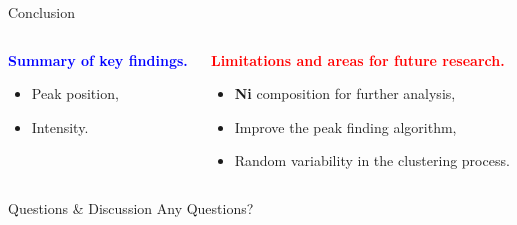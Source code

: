 \documentclass[aspectratio=169]{beamer}
\begin{document}
\begin{frame}{Conclusion}
  \begin{columns}
    \begin{column}{0.5\textwidth}
      \centering
      \textbf{\textcolor{blue}{Summary of key findings.}}
      \begin{itemize}
        \item Peak position,
        \item Intensity.
      \end{itemize}
    \end{column}
    
    \begin{column}{0.5\textwidth}
      \centering
      \textbf{\textcolor{red}{Limitations and areas for future research.}}
      \begin{itemize}
        \item \textbf{Ni} composition for further analysis,
        \item Improve the peak finding algorithm,
        \item Random variability in the clustering process.
      \end{itemize}
    \end{column}
  \end{columns}
\end{frame}



\begin{frame}{Questions \& Discussion}
    \centering
    \Huge Any Questions?
\end{frame}
\end{document}
